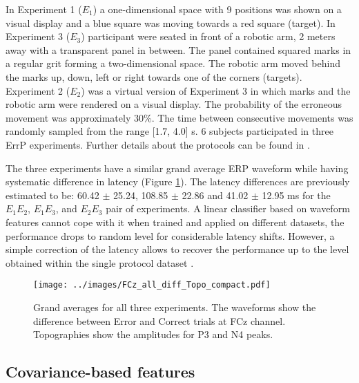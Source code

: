 \documentclass[12pt]{iopart}
\begin{document}
In Experiment 1 ($E_1$) a one-dimensional space with 9 positions was shown on a visual display and
a blue square was moving towards a red square (target). In Experiment 3 ($E_3$) participant were seated
in front of a robotic arm, 2 meters away with a transparent panel in between.
The panel contained squared marks in a regular grit forming a two-dimensional space.
The robotic arm moved behind the marks up, down, left or right 
towards one of the corners (targets).
Experiment 2 ($E_2$) was a virtual version of Experiment 3 in which marks and the robotic arm
were rendered on a visual display.
The probability of the erroneous
movement was approximately 30\%. The time between consecutive movements was randomly sampled
from the range [1.7, 4.0] s. 
6 subjects participated in three ErrP experiments.
Further details about the protocols can be found in \cite{iturrate_latency_2014-1}.

The three experiments have a similar grand average ERP waveform 
while having systematic difference in latency (Figure \ref{fig:FCz}).
The latency differences are previously estimated to be:
60.42 $\pm$ 25.24, 108.85 $\pm$ 22.86 and 41.02 $\pm$ 12.95 ms
for the $E_1 E_2$, $E_1 E_3$, and $E_2 E_3$ pair of experiments.
A linear classifier
based on waveform features cannot cope with it when trained and applied
on different datasets, the performance drops to random level
for considerable latency shifts. However, a simple correction of 
the latency allows to recover the performance up to the level
obtained within the single protocol dataset  \cite{iturrate_latency_2014-1}.


\begin{figure}[!t]
    \texttt{[image: ../images/FCz\_all\_diff\_Topo\_compact.pdf]}
\caption{Grand averages for all three experiments. The waveforms show the difference between
Error and Correct trials at FCz channel. Topographies show the amplitudes for P3 and N4 peaks.}
\label{fig:FCz}
\end{figure}


\subsection{Covariance-based features}
\end{document}
